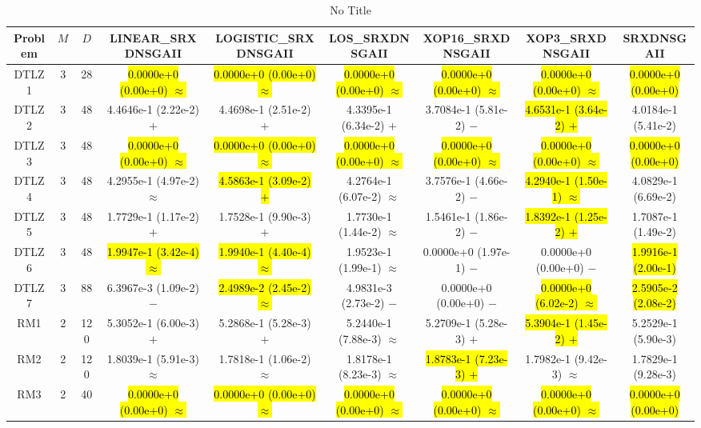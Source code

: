 \documentclass[journal]{IEEEtran}
\begin{document}
\begin{table*}[htbp]
\renewcommand{\arraystretch}{1.2}
\centering
\caption{No Title}
\begin{tabular}{ccccccccc}
\toprule
Problem&$M$&$D$&LINEAR\_SRXDNSGAII&LOGISTIC\_SRXDNSGAII&LOS\_SRXDNSGAII&XOP16\_SRXDNSGAII&XOP3\_SRXDNSGAII&SRXDNSGAII\\
\midrule
\multirow{1}{*}{DTLZ1}&3&28&\hl{0.0000e+0 (0.00e+0) $\approx$}&\hl{0.0000e+0 (0.00e+0) $\approx$}&\hl{0.0000e+0 (0.00e+0) $\approx$}&\hl{0.0000e+0 (0.00e+0) $\approx$}&\hl{0.0000e+0 (0.00e+0) $\approx$}&\hl{0.0000e+0 (0.00e+0)}\\
\hline
\multirow{1}{*}{DTLZ2}&3&48&4.4646e-1 (2.22e-2) $+$&4.4698e-1 (2.51e-2) $+$&4.3395e-1 (6.34e-2) $+$&3.7084e-1 (5.81e-2) $-$&\hl{4.6531e-1 (3.64e-2) $+$}&4.0184e-1 (5.41e-2)\\
\hline
\multirow{1}{*}{DTLZ3}&3&48&\hl{0.0000e+0 (0.00e+0) $\approx$}&\hl{0.0000e+0 (0.00e+0) $\approx$}&\hl{0.0000e+0 (0.00e+0) $\approx$}&\hl{0.0000e+0 (0.00e+0) $\approx$}&\hl{0.0000e+0 (0.00e+0) $\approx$}&\hl{0.0000e+0 (0.00e+0)}\\
\hline
\multirow{1}{*}{DTLZ4}&3&48&4.2955e-1 (4.97e-2) $\approx$&\hl{4.5863e-1 (3.09e-2) $+$}&4.2764e-1 (6.07e-2) $\approx$&3.7576e-1 (4.66e-2) $-$&\hl{4.2940e-1 (1.50e-1) $\approx$}&4.0829e-1 (6.69e-2)\\
\hline
\multirow{1}{*}{DTLZ5}&3&48&1.7729e-1 (1.17e-2) $+$&1.7528e-1 (9.90e-3) $+$&1.7730e-1 (1.44e-2) $\approx$&1.5461e-1 (1.86e-2) $-$&\hl{1.8392e-1 (1.25e-2) $+$}&1.7087e-1 (1.49e-2)\\
\hline
\multirow{1}{*}{DTLZ6}&3&48&\hl{1.9947e-1 (3.42e-4) $\approx$}&\hl{1.9940e-1 (4.40e-4) $\approx$}&1.9523e-1 (1.99e-1) $\approx$&0.0000e+0 (1.97e-1) $-$&0.0000e+0 (0.00e+0) $-$&\hl{1.9916e-1 (2.00e-1)}\\
\hline
\multirow{1}{*}{DTLZ7}&3&88&6.3967e-3 (1.09e-2) $-$&\hl{2.4989e-2 (2.45e-2) $\approx$}&4.9831e-3 (2.73e-2) $-$&0.0000e+0 (0.00e+0) $-$&\hl{0.0000e+0 (6.02e-2) $\approx$}&\hl{2.5905e-2 (2.08e-2)}\\
\hline
\multirow{1}{*}{RM1}&2&120&5.3052e-1 (6.00e-3) $+$&5.2868e-1 (5.28e-3) $+$&5.2440e-1 (7.88e-3) $\approx$&5.2709e-1 (5.28e-3) $+$&\hl{5.3904e-1 (1.45e-2) $+$}&5.2529e-1 (5.90e-3)\\
\hline
\multirow{1}{*}{RM2}&2&120&1.8039e-1 (5.91e-3) $\approx$&1.7818e-1 (1.06e-2) $\approx$&1.8178e-1 (8.23e-3) $\approx$&\hl{1.8783e-1 (7.23e-3) $+$}&1.7982e-1 (9.42e-3) $\approx$&1.7829e-1 (9.28e-3)\\
\hline
\multirow{1}{*}{RM3}&2&40&\hl{0.0000e+0 (0.00e+0) $\approx$}&\hl{0.0000e+0 (0.00e+0) $\approx$}&\hl{0.0000e+0 (0.00e+0) $\approx$}&\hl{0.0000e+0 (0.00e+0) $\approx$}&\hl{0.0000e+0 (0.00e+0) $\approx$}&\hl{0.0000e+0 (0.00e+0)}\\

\end{tabular}
\end{table*}
\end{document}
